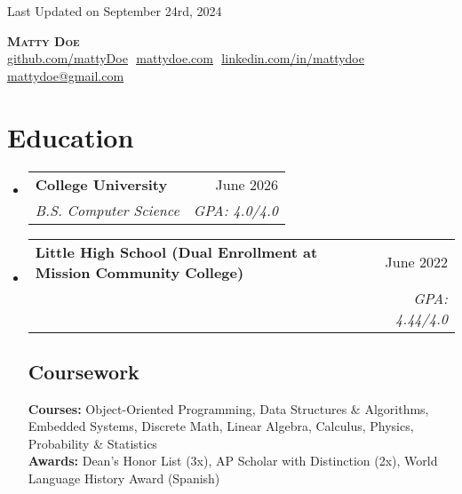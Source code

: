 \documentclass[letterpaper,11pt]{article}
\makeatletter
\newcommand{\resumeSubheading}[4]{
  \vspace{-2pt}\item
    \begin{tabular*}{0.97\textwidth}[t]{l@{\extracolsep{\fill}}r}
      \textbf{#1} & {\small #2} \\
      \textit{\small#3} & \textit{\small #4} \\
    \end{tabular*}\vspace{-7pt}
}
\newcommand{\resumeSubHeadingListStart}{\begin{itemize}[leftmargin=0.15in, label={}]}
\newcommand{\resumeSubHeadingListEnd}{\end{itemize}}
\makeatother
\begin{document}
\begin{flushright}
  \color{gray}
  \item
  Last Updated on September 24rd, 2024
\end{flushright}

\vspace{-5pt}

\begin{center}
    \textbf{\Huge \scshape Matty Doe} \\ \vspace{8pt}
    \small 
    \href{https://github.com/mattyDoe}{\underline{github.com/mattyDoe}} $  $
    \href{https://www.mattydoe.com}{\underline{mattydoe.com}} $  $
    \href{https://linkedin.com/in/mattydoe}{\underline{linkedin.com/in/mattydoe}} $  $
    \href{mailto:mattydoe@gmail.com}{\underline{mattydoe@gmail.com}}
\end{center}

\section{Education}
  \resumeSubHeadingListStart
  
    \resumeSubheading
      {College University}{June 2026}
      {B.S. Computer Science}{GPA: 4.0/4.0}
      
    \resumeSubheading
      {Little High School \footnotesize{(Dual Enrollment at Mission Community College)}}{June 2022}
      {}{GPA: 4.44/4.0}

    \vspace{-10pt}

    \subsection{Coursework}
      \textbf{Courses:} Object-Oriented Programming, Data Structures \& Algorithms, Embedded Systems, Discrete Math, Linear Algebra, Calculus, Physics, Probability \& Statistics \\
      \textbf{Awards:} Dean's Honor List (3x), AP Scholar with Distinction (2x), World Language History Award (Spanish)

  \resumeSubHeadingListEnd

\end{document}
